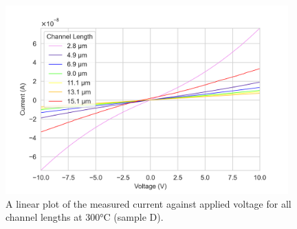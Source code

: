 \begin{figure}[h]
    \centering
    \includegraphics[width=0.97\textwidth]{Chapter6/Figs/Raster/Sample D 2019/IV/10V IV characteristics at 300 C.png}
    \caption{A linear plot of the measured current against applied voltage for all channel lengths at 300\si{\degreeCelsius} (sample D).}
    \label{appfig:D_current_voltage_300_10V}
\end{figure}